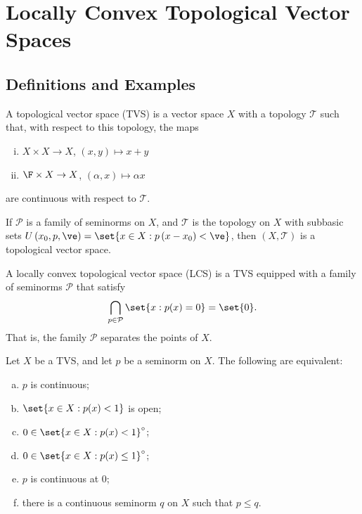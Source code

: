 \documentclass[10pt]{mypackage}
\begin{document}
\RaggedRight
\tableofcontents
\section{Locally Convex Topological Vector Spaces}%
\subsection{Definitions and Examples}%
\begin{definition}
  A topological vector space (TVS) is a vector space $X$ with a topology $ \mathcal{T} $ such that, with respect to this topology, the maps
  \begin{enumerate}[(i)]
    \item $X\times X \rightarrow X$, $\left( x,y \right)\mapsto x + y$
    \item $\F\times X \rightarrow X$, $\left( \alpha,x \right)\mapsto \alpha x$
  \end{enumerate}
  are continuous with respect to $ \mathcal{T} $.
\end{definition}
\begin{example}
  If $ \mathcal{P} $ is a family of seminorms on $X$, and $\mathcal{T}$ is the topology on $X$ with subbasic sets $U \left( x_0,p,\ve \right) = \set{x\in X : p\left( x-x_0 \right) < \ve}$, then $\left( X,\mathcal{T} \right)$ is a topological vector space.
\end{example}
\begin{definition}
  A locally convex topological vector space (LCS) is a TVS equipped with a family of seminorms $ \mathcal{P} $ that satisfy
  \begin{align*}
    \bigcap_{p\in \mathcal{P}} \set{x : p(x) = 0} = \set{0}.
  \end{align*}
  That is, the family $ \mathcal{P} $ separates the points of $X$.
\end{definition}
\begin{proposition}
  Let $X$ be a TVS, and let $ p $ be a seminorm on $X$. The following are equivalent:
  \begin{enumerate}[(a)]
    \item $p$ is continuous;
    \item $\set{x\in X : p(x) < 1}$  is open;
    \item $0\in \set{x\in X : p(x) < 1}^{\circ}$;
    \item $0\in \set{x\in X : p(x) \leq 1}^{\circ}$;
    \item $p$ is continuous at $0$;
    \item there is a continuous seminorm $q$ on $X$ such that $p\leq q$.
  \end{enumerate}
\end{proposition}
\end{document}
